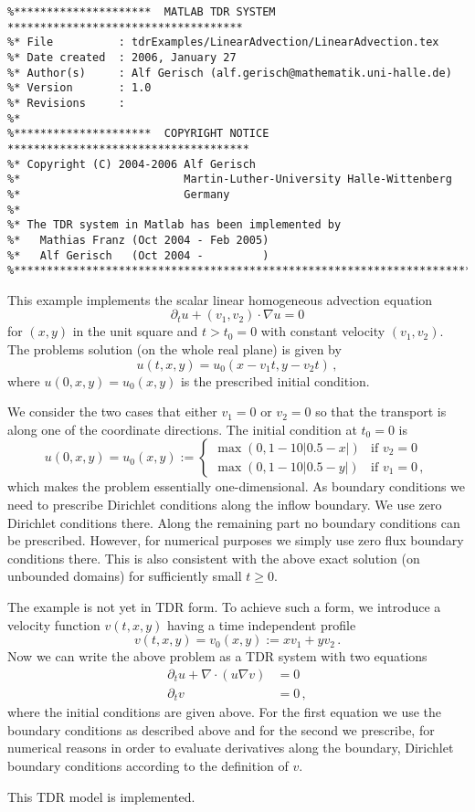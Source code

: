 \documentclass{article}
\begin{document}
\begin{verbatim}
%*********************  MATLAB TDR SYSTEM  ************************************
%* File          : tdrExamples/LinearAdvection/LinearAdvection.tex
%* Date created  : 2006, January 27
%* Author(s)     : Alf Gerisch (alf.gerisch@mathematik.uni-halle.de)
%* Version       : 1.0
%* Revisions     : 
%*
%*********************  COPYRIGHT NOTICE  *************************************
%* Copyright (C) 2004-2006 Alf Gerisch
%*                         Martin-Luther-University Halle-Wittenberg
%*                         Germany
%*
%* The TDR system in Matlab has been implemented by
%*   Mathias Franz (Oct 2004 - Feb 2005)
%*   Alf Gerisch   (Oct 2004 -         )
%******************************************************************************
\end{verbatim}


This example implements the scalar linear homogeneous advection equation
\[
\partial_t u + (v_1, v_2)\cdot\nabla u = 0
\]
for $(x,y)$ in the unit square and $t>t_0=0$ with constant velocity
$(v_1, v_2)$. 
The problems solution (on the whole real plane) is given by
\[
u(t,x,y)=u_0(x-v_1t, y-v_2t)\,,
\]
where $u(0,x,y)=u_0(x,y)$ is the prescribed initial condition.

 
We consider the two cases that either $v_1=0$ or $v_2=0$ so that the
transport is along one of the coordinate directions. 
The initial condition at $t_0=0$ is
\[
u(0,x,y) = u_0(x,y):=
\begin{cases}
\max(0, 1 - 10 |0.5-x|) & \text{if } v_2 = 0\\
\max(0, 1 - 10 |0.5-y|) & \text{if } v_1 = 0\,,
\end{cases}
\]
which makes the problem essentially one-dimensional.
As boundary conditions we need to prescribe Dirichlet conditions along
the inflow boundary. We use zero Dirichlet conditions there. Along the
remaining part no boundary conditions can be prescribed. However, for
numerical purposes we simply use zero flux boundary conditions
there. This is also consistent with the above exact solution (on
unbounded domains) for sufficiently small $t\ge 0$.


The example is not yet in TDR form. To achieve such a form, we
introduce a velocity function $v(t,x,y)$ having a time independent
profile 
\[
v(t,x,y)=v_0(x,y):=x v_1 + y v_2\,.
\]
Now we can write the above problem as a TDR system with two equations
\begin{align*}
\partial_t u +\nabla\cdot(u \nabla v) &= 0\\
\partial_t v                  &= 0\,,
\end{align*}
where the initial conditions are given above. For the first equation we
use the boundary conditions as described above and for the second we
prescribe, for numerical reasons in order to evaluate derivatives
along the boundary, Dirichlet boundary conditions according to the
definition of $v$.

This TDR model is implemented. 
\end{document}

